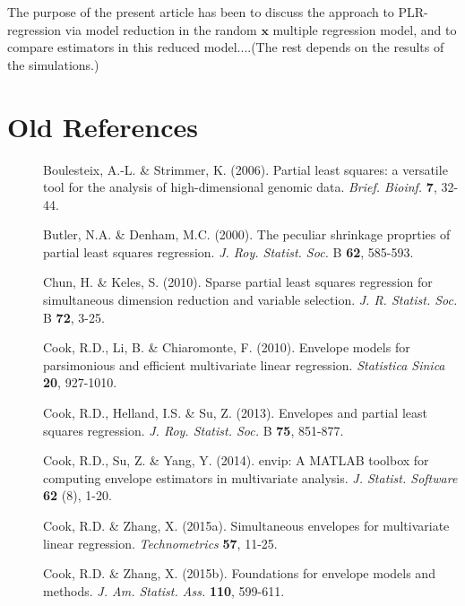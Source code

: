 \documentclass[11pt]{article}
\begin{document}
The purpose of the present article has been to discuss the approach to PLR-regression via model reduction in the random $\bm{x}$ multiple regression model, and to compare estimators in this reduced model....(The rest depends on the results of the simulations.)



\section{Old References}

\begin{description}

\item[] Boulesteix, A.-L. \& Strimmer, K. (2006). Partial least squares: a versatile tool for the analysis of high-dimensional genomic data. \textit{Brief. Bioinf.} \textbf{7}, 32-44.

\item[] Butler, N.A. \& Denham, M.C. (2000). The peculiar shrinkage proprties of partial least squares regression. \textit{J. Roy. Statist. Soc.} B \textbf{62}, 585-593.

\item[] Chun, H. \& Keles, S. (2010). Sparse partial least squares regression for simultaneous dimension reduction and variable selection. \textit{J. R. Statist. Soc.} B \textbf{72}, 3-25.

\item[] Cook, R.D., Li, B. \& Chiaromonte, F. (2010). Envelope models for parsimonious and efficient multivariate linear regression. \textit{Statistica Sinica} \textbf{20}, 927-1010.

\item[] Cook, R.D., Helland, I.S. \& Su, Z. (2013). Envelopes and partial least squares regression.  \textit{J. Roy. Statist. Soc.} B \textbf{75}, 851-877.

\item[] Cook, R.D., Su, Z. \& Yang, Y. (2014). envip: A MATLAB toolbox for computing envelope estimators in multivariate analysis. \textit{J. Statist. Software} \textbf{62} (8), 1-20.

\item[] Cook, R.D. \& Zhang, X. (2015a). Simultaneous envelopes for multivariate linear regression. \textit{Technometrics} \textbf{57}, 11-25.

\item[] Cook, R.D. \& Zhang, X. (2015b). Foundations for envelope models and methods. \textit{J. Am. Statist. Ass.} \textbf{110}, 599-611.


\end{description}
\end{document}

